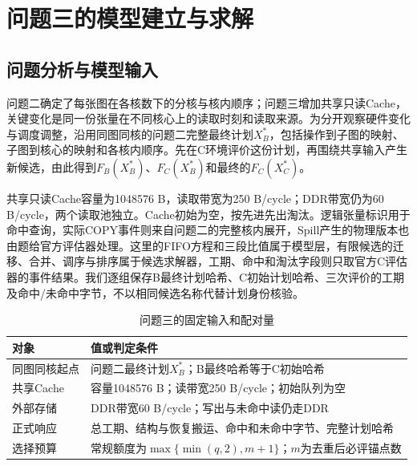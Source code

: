 \section{问题三的模型建立与求解}
\label{sec:question-three}

\subsection{问题分析与模型输入}
问题二确定了每张图在各核数下的分核与核内顺序；问题三增加共享只读Cache，关键变化是同一份张量在不同核心上的读取时刻和读取来源。为分开观察硬件变化与调度调整，沿用同图同核的问题二完整最终计划$X_B^*$，包括操作到子图的映射、子图到核心的映射和各核内顺序。先在C环境评价这份计划，再围绕共享输入产生新候选，由此得到$F_B(X_B^*)$、$F_C(X_B^*)$和最终的$F_C(X_C^*)$。

共享只读Cache容量为1048576 B，读取带宽为250 B/cycle；DDR带宽仍为60 B/cycle，两个读取池独立。Cache初始为空，按先进先出淘汰。逻辑张量标识用于命中查询，实际COPY事件则来自问题二的完整核内展开，Spill产生的物理版本也由题给官方评估器处理。这里的FIFO方程和三段比值属于模型层，有限候选的迁移、合并、调序与排序属于候选求解器，工期、命中和淘汰字段则只取官方C评估器的事件结果。我们逐组保存B最终计划哈希、C初始计划哈希、三次评价的工期及命中/未命中字节，不以相同候选名称代替计划身份核验。
\begin{table}[H]\centering\caption{问题三的固定输入和配对量}\label{tab:c-inputs}
\begin{tabularx}{\linewidth}{lY}\toprule
对象 & 值或判定条件\\\midrule
同图同核起点 & 问题二最终计划$X_B^*$；B最终哈希等于C初始哈希\\
共享Cache & 容量1048576 B；读带宽250 B/cycle；初始队列为空\\
外部存储 & DDR带宽60 B/cycle；写出与未命中读仍走DDR\\
正式响应 & 总工期、结构与恢复搬运、命中和未命中字节、完整计划哈希\\
选择预算 & 常规额度为$\max\{\min(q,2),m+1\}$；$m$为去重后必评锚点数\\\bottomrule
\end{tabularx}\end{table}

